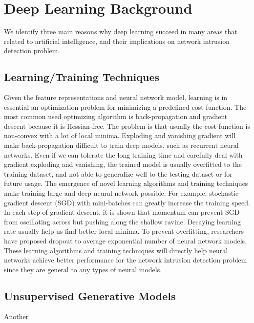 \section{Deep Learning Background}
We identify three main reasons why deep learning succeed in many areas that related
to artificial intelligence, and their implications on network intrusion detection problem.

\subsection{Learning/Training Techniques}
Given the feature representations and neural network model, learning is in essential an optimization
problem for minimizing a predefined cost function.
The most common used optimizing algorithm is back-propagation and gradient descent because it is Hessian-free.
The problem is that usually the cost function is non-convex with a lot of local minima.
Exploding and vanishing gradient will make back-propagation difficult to train deep models, such as recurrent neural networks.
Even if we can tolerate the long training time and carefully deal with gradient exploding and vanishing,
the trained model is usually overfitted to the training dataset, and not able to generalize well to the testing dataset or for future usage.
The emergence of novel learning algorithms and training techniques make training large and deep
neural network possible.
For example, stochastic gradient descent (SGD) with mini-batches can greatly increase the training speed.
In each step of gradient descent, it is shown that momentum can prevent SGD from oscillating across but pushing along the shallow ravine.
Decaying learning rate usually help us find better local minima.
To prevent overfitting, researchers have proposed dropout to average exponential number of neural network models.
These learning algorithms and training techniques will directly help neural networks achieve
better performance for the network intrusion detection problem since they are general to any types of neural models.


\subsection{Unsupervised Generative Models}
Another 

